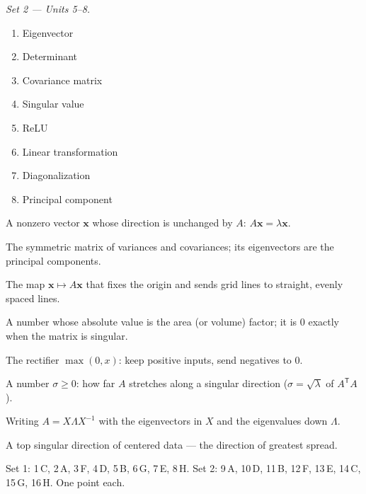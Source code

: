\documentclass[10pt]{article}
\newcommand{\xx}{\mathbf{x}}
\newcommand{\T}{\mathsf{T}}
\begin{document}
\vspace{6pt}
\noindent\textit{Set 2 --- Units 5--8.}\\[2pt]
\noindent
\begin{minipage}[t]{0.40\textwidth}
\begin{enumerate}[leftmargin=2.2em, itemsep=5pt, label=\arabic*., start=9]
  \item Eigenvector 
  \item Determinant 
  \item Covariance matrix 
  \item Singular value 
  \item ReLU 
  \item Linear transformation 
  \item Diagonalization 
  \item Principal component 
\end{enumerate}
\end{minipage}%
\hfill
\begin{minipage}[t]{0.57\textwidth}
\small
\begin{description}[leftmargin=1.4em, itemsep=2pt]
  \item[(A)] A nonzero vector $\xx$ whose direction is unchanged by $A$: $A\xx=\lambda\xx$.
  \item[(B)] The symmetric matrix of variances and covariances; its eigenvectors are the principal components.
  \item[(C)] The map $\xx\mapsto A\xx$ that fixes the origin and sends grid lines to straight, evenly spaced lines.
  \item[(D)] A number whose absolute value is the area (or volume) factor; it is $0$ exactly when the matrix is singular.
  \item[(E)] The rectifier $\max(0,x)$: keep positive inputs, send negatives to $0$.
  \item[(F)] A number $\sigma\ge0$: how far $A$ stretches along a singular direction ($\sigma=\sqrt\lambda$ of $A^\T A$).
  \item[(G)] Writing $A=X\Lambda X^{-1}$ with the eigenvectors in $X$ and the eigenvalues down $\Lambda$.
  \item[(H)] A top singular direction of centered data --- the direction of greatest spread.
\end{description}
\end{minipage}

\begin{teachernote}
Set 1: 1\,C, 2\,A, 3\,F, 4\,D, 5\,B, 6\,G, 7\,E, 8\,H. \quad
Set 2: 9\,A, 10\,D, 11\,B, 12\,F, 13\,E, 14\,C, 15\,G, 16\,H. \quad One point each.
\end{teachernote}
\end{document}
